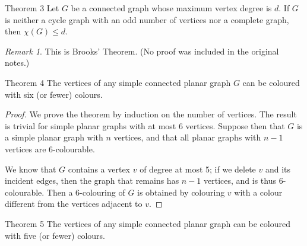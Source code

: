 \documentclass[11pt]{scrartcl}
\theoremstyle{plain}
\theoremstyle{remark}
\newtheorem*{remark}{Remark}
\begin{document}
\begin{thmbox}{Theorem 3}
Let $G$ be a connected graph whose maximum vertex degree is $d$. If $G$ is neither a cycle graph with an odd number of vertices nor a complete graph, then $\chi(G) \leq d$.
\end{thmbox}

\begin{remark}
This is Brooks' Theorem. (No proof was included in the original notes.)
\end{remark}

\begin{thmbox}{Theorem 4}
The vertices of any simple connected planar graph $G$ can be coloured with six (or fewer) colours.
\end{thmbox}

\begin{proof}
We prove the theorem by induction on the number of vertices. The result is trivial for simple planar graphs with at most 6 vertices. Suppose then that $G$ is a simple planar graph with $n$ vertices, and that all planar graphs with $n-1$ vertices are 6-colourable.

We know that $G$ contains a vertex $v$ of degree at most 5; if we delete $v$ and its incident edges, then the graph that remains has $n-1$ vertices, and is thus 6-colourable. Then a 6-colouring of $G$ is obtained by colouring $v$ with a colour different from the vertices adjacent to $v$.
\end{proof}

\begin{thmbox}{Theorem 5}
The vertices of any simple connected planar graph can be coloured with five (or fewer) colours.
\end{thmbox}
\end{document}
